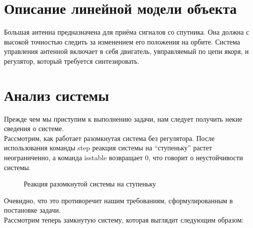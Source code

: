 \documentclass[12pt, a4paper]{report}
\theoremstyle{definition}
\theoremstyle{plain}
\theoremstyle{remark}
\theoremstyle{remark}
\theoremstyle{definition}
\begin{document}
\section{Описание линейной модели объекта}
\label{sec:W1}

Большая антенна предназначена для приёма сигналов со спутника. Она должна с высокой точностью следить за изменением его положения на орбите. Система управления антенной включает в себя двигатель, увправляемый по цепи якоря, и регулятор, который требуется синтезировать.

\section{Анализ системы}
Прежде чем мы приступим к выполнению задачи, нам следует получить некие сведения о системе. \\
Рассмотрим, как работает разомкнутая система без регулятора. После
использования команды step реакция системы на “ступеньку” растет неограниченно, а команда  isstable возвращает 0,  что говорит о неустойчивости системы. 

 \begin{figure}[h!]
    \caption{Реакция разомкнутой системы на ступеньку}
\end{figure}

\newpage
Очевидно, что это противоречит нашим требованиям, сформулированным в
постановке задачи.\\
Рассмотрим теперь замкнутую систему, которая выглядит следующим
образом:
\end{document}
